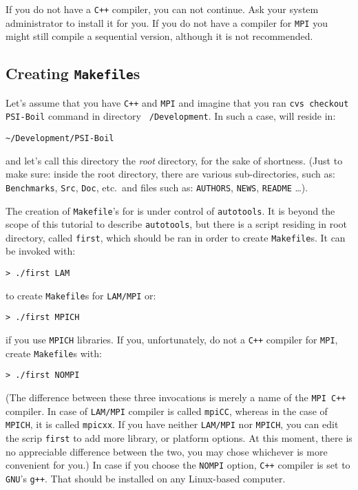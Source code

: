 If you do not have a {\tt C++} compiler, you can not continue. Ask your system 
administrator to install it for you. If you do not have a compiler for {\tt MPI} 
you might still compile a sequential version, although it is not recommended. 

\subsection{Creating {\tt Makefile}s}
\label{sub_sec_creating_makefiles}

Let's assume that you have {\tt C++} and {\tt MPI} and imagine that you ran 
{\tt cvs checkout PSI-Boil} command in directory {\tt ~/Development}.
In such a case, {\psiboil} will reside in:
%
\begin{verbatim}
~/Development/PSI-Boil
\end{verbatim}
%
and let's call this directory the {\em root} directory, for the sake of shortness.
(Just to make sure: inside the root directory, there are various 
sub-directories, such as: {\tt Benchmarks}, {\tt Src}, {\tt Doc}, etc.\ and 
files such as: {\tt AUTHORS}, {\tt NEWS}, {\tt README} \dots).

The creation of {\tt Makefile}'s for {\psiboil} is under control of 
{\tt autotools}. It is beyond the scope of this tutorial to describe {\tt autotools}, 
but there is a script residing in root directory, called {\tt first}, which
should be ran in order to create {\tt Makefile}s. It can be invoked with:
%
\begin{verbatim}
> ./first LAM
\end{verbatim}
%
to create {\tt Makefile}s for {\tt LAM/MPI} or:
%
\begin{verbatim}
> ./first MPICH
\end{verbatim}
%
if you use {\tt MPICH} libraries. If you, unfortunately, do not a {\tt C++}
compiler for {\tt MPI}, create {\tt Makefile}s with:
%
\begin{verbatim}
> ./first NOMPI
\end{verbatim}
%
(The difference between these three invocations
is merely a name of the {\tt MPI C++} compiler. In case of {\tt LAM/MPI} compiler
is called {\tt mpiCC}, whereas in the case of {\tt MPICH}, it is called {\tt mpicxx}.
If you have neither {\tt LAM/MPI} nor {\tt MPICH}, you can edit the scrip {\tt first}
to add more library, or platform options. At this moment, there is no appreciable 
difference between the two, you may chose whichever is more convenient for you.) 
In case if you choose the {\tt NOMPI} option, {\tt C++} compiler is set to {\tt GNU}'s
{\tt g++}. That should be installed on any Linux-based computer. 

